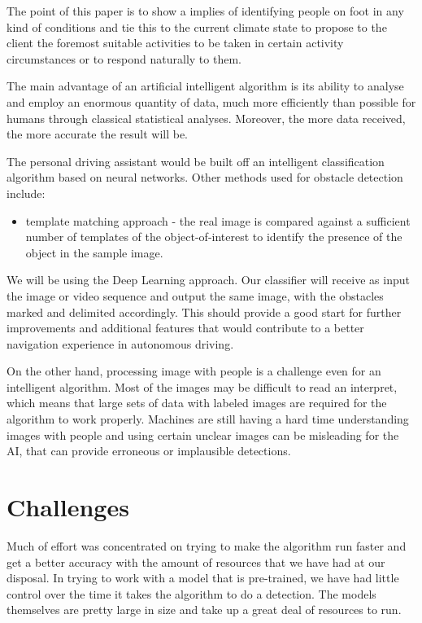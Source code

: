 \documentclass[runningheads,a4paper,11pt]{report}
\begin{document}
The point of this paper is to show a implies of identifying people on foot in any kind of conditions and tie this to the current climate state to propose to the client the foremost suitable activities to be taken in certain activity circumstances or to respond naturally to them.

The main advantage of an artificial intelligent algorithm is its ability to analyse and employ an enormous quantity of data, much more efficiently than possible for humans through classical statistical analyses. Moreover, the more data received, the more accurate the result will be.

The personal driving assistant would be built off an intelligent classification algorithm based on neural networks. Other methods used for obstacle detection include:
\begin{itemize}
	\item template matching approach - the real image is compared against a sufficient number of templates of the object-of-interest to identify the presence of the object in the sample image.
\end{itemize}

We will be using the Deep Learning approach. Our classifier will receive as input the image or video sequence and output the same image, with the obstacles marked and delimited accordingly. This should provide a good start for further improvements and additional features that would contribute to a better navigation experience in autonomous driving.

On the other hand, processing image with people is a challenge even for an intelligent algorithm. Most of the images may be difficult to read an interpret, which means that large sets of data with labeled images are required for the algorithm to work properly. Machines are still having a hard time understanding images with people and using certain unclear images can be misleading for the AI, that can provide erroneous or implausible detections.

\section{Challenges}

Much of effort was concentrated on trying to make the algorithm run faster and get a better accuracy with the amount of resources that we have had at our disposal. In trying to work with a model that is pre-trained, we have had little control over the time it takes the algorithm to do a detection. The models themselves are pretty large in size and take up a great deal of resources to run. 
\end{document}
